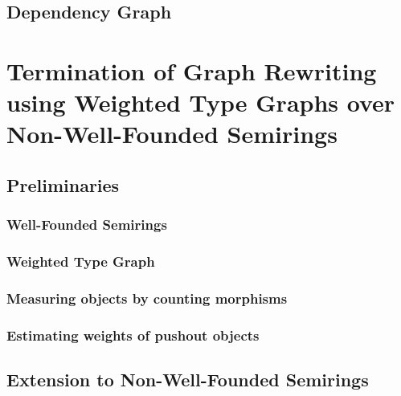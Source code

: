 \documentclass{report}
\begin{document}
\section{Dependency Graph}


\chapter{Termination of Graph Rewriting using Weighted Type Graphs over Non-Well-Founded Semirings} 
\label{chap:nwf}



\section{Preliminaries}

\subsection{Well-Founded Semirings} 
\label{sec:well_founded_semiring}

 
\subsection{Weighted Type Graph} 
\label{sec:weighted_type_graph}


\subsection{Measuring objects by counting morphisms}
\label{sec:type_graph:wf:measuring_graphs}

  
\subsection{Estimating weights of pushout objects} 
\label{sec:type_graph:wf:weighing_pushout} 
   

    
  
\section{Extension to Non-Well-Founded Semirings}
\end{document}
